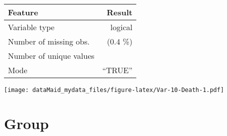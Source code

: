 \documentclass[]{report}
\begin{document}
\begin{minipage}{0.75 \textwidth}

\begin{longtable}[]{@{}lr@{}}
\toprule
\begin{minipage}[b]{0.34\columnwidth}\raggedright
Feature\strut
\end{minipage} & \begin{minipage}[b]{0.16\columnwidth}\raggedleft
Result\strut
\end{minipage}\tabularnewline
\midrule
\endhead
\begin{minipage}[t]{0.34\columnwidth}\raggedright
Variable type\strut
\end{minipage} & \begin{minipage}[t]{0.16\columnwidth}\raggedleft
logical\strut
\end{minipage}\tabularnewline
\begin{minipage}[t]{0.34\columnwidth}\raggedright
Number of missing obs.\strut
\end{minipage} & \begin{minipage}[t]{0.16\columnwidth}\raggedleft
1 (0.4 \%)\strut
\end{minipage}\tabularnewline
\begin{minipage}[t]{0.34\columnwidth}\raggedright
Number of unique values\strut
\end{minipage} & \begin{minipage}[t]{0.16\columnwidth}\raggedleft
2\strut
\end{minipage}\tabularnewline
\begin{minipage}[t]{0.34\columnwidth}\raggedright
Mode\strut
\end{minipage} & \begin{minipage}[t]{0.16\columnwidth}\raggedleft
``TRUE''\strut
\end{minipage}\tabularnewline
\bottomrule
\end{longtable}

\end{minipage}
\begin{minipage}{0.25 \textwidth}

\texttt{[image: dataMaid\_mydata\_files/figure-latex/Var-10-Death-1.pdf]}

\end{minipage}

\noindent\makebox[\linewidth]{\rule{\textwidth}{0.4pt}}

\hypertarget{group}{%
\section{Group}\label{group}}
\end{document}
